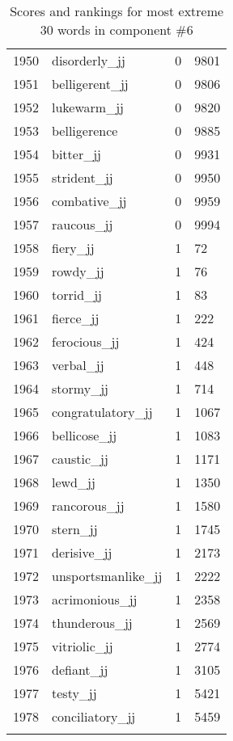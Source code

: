 \begin{longtable}[!htbp]{| rlr@{.}l |}
    1950 & disorderly\_jj & 0 & 9801 \\
    1951 & belligerent\_jj & 0 & 9806 \\
    1952 & lukewarm\_jj & 0 & 9820 \\
    1953 & belligerence & 0 & 9885 \\
    1954 & bitter\_jj & 0 & 9931 \\
    1955 & strident\_jj & 0 & 9950 \\
    1956 & combative\_jj & 0 & 9959 \\
    1957 & raucous\_jj & 0 & 9994 \\
    1958 & fiery\_jj & 1 & 72 \\
    1959 & rowdy\_jj & 1 & 76 \\
    1960 & torrid\_jj & 1 & 83 \\
    1961 & fierce\_jj & 1 & 222 \\
    1962 & ferocious\_jj & 1 & 424 \\
    1963 & verbal\_jj & 1 & 448 \\
    1964 & stormy\_jj & 1 & 714 \\
    1965 & congratulatory\_jj & 1 & 1067 \\
    1966 & bellicose\_jj & 1 & 1083 \\
    1967 & caustic\_jj & 1 & 1171 \\
    1968 & lewd\_jj & 1 & 1350 \\
    1969 & rancorous\_jj & 1 & 1580 \\
    1970 & stern\_jj & 1 & 1745 \\
    1971 & derisive\_jj & 1 & 2173 \\
    1972 & unsportsmanlike\_jj & 1 & 2222 \\
    1973 & acrimonious\_jj & 1 & 2358 \\
    1974 & thunderous\_jj & 1 & 2569 \\
    1975 & vitriolic\_jj & 1 & 2774 \\
    1976 & defiant\_jj & 1 & 3105 \\
    1977 & testy\_jj & 1 & 5421 \\
    1978 & conciliatory\_jj & 1 & 5459 \\
    \hline
    \caption{Scores and rankings for most extreme 30 words in component \#6} \\
\end{longtable}
